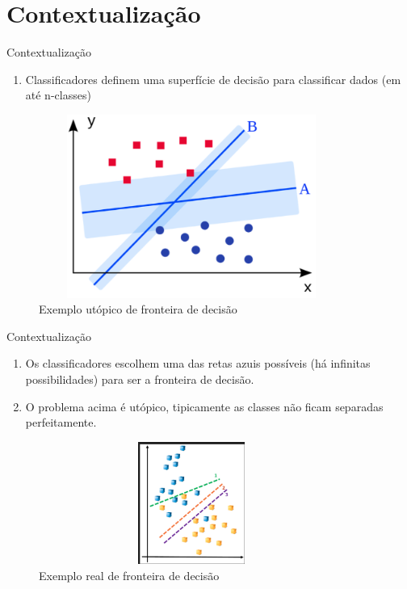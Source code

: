 \section{Contextualização}

\begin{frame}
	\begin{block}{Contextualização}
		\begin{enumerate}
			\item Classificadores definem uma superfície de decisão para classificar dados (em até n-classes)
		\end{enumerate}
		\begin{figure}[!htb]
			\centering	  				
			\includegraphics[height=6cm, width = 10cm]{./pic/fronteirautopia.png}
			\caption{Exemplo utópico de fronteira de decisão}
			\label{fig_ds_process}
		\end{figure}	
	\end{block}
\end{frame}

\begin{frame}
	\begin{block}{Contextualização}
		\begin{enumerate}
			\item Os classificadores escolhem uma das retas azuis possíveis (há infinitas possibilidades) para ser a fronteira de decisão.
			\item O problema acima é utópico, tipicamente as classes não ficam separadas perfeitamente.
		\end{enumerate}
			\begin{figure}[!htb]
			\centering	  				
			\includegraphics[height=4cm, width = 10cm]{./pic/fronteirareal.png}
			\caption{Exemplo real de fronteira de decisão}
			\label{fig_ds_process}
		\end{figure}	
	\end{block}
\end{frame}

